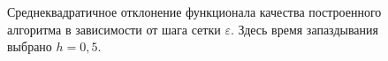 \begin{figure}[bh]
        \noindent{}
        \caption{Среднеквадратичное отклонение функционала качества построенного алгоритма в зависимости от шага сетки $\varepsilon$. Здесь время запаздывания выбрано $h = 0,\!5$.}
        \label{img:square}
\end{figure}